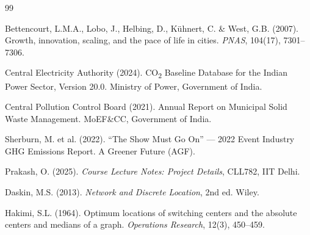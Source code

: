 \documentclass[11pt,a4paper]{article}
\begin{document}
\begin{thebibliography}{99}

Bettencourt, L.M.A., Lobo, J., Helbing, D., K\"uhnert, C. \& West, G.B. (2007).
Growth, innovation, scaling, and the pace of life in cities.
\textit{PNAS}, 104(17), 7301--7306.

Central Electricity Authority (2024).
CO\textsubscript{2} Baseline Database for the Indian Power Sector, Version 20.0.
Ministry of Power, Government of India.

Central Pollution Control Board (2021).
Annual Report on Municipal Solid Waste Management.
MoEF\&CC, Government of India.

Sherburn, M. et al. (2022).
``The Show Must Go On'' --- 2022 Event Industry GHG Emissions Report.
A Greener Future (AGF).

Prakash, O. (2025).
\textit{Course Lecture Notes: Project Details}, CLL782, IIT Delhi.

Daskin, M.S. (2013).
\textit{Network and Discrete Location}, 2nd ed. Wiley.

Hakimi, S.L. (1964).
Optimum locations of switching centers and the absolute centers and medians of a graph.
\textit{Operations Research}, 12(3), 450--459.

\end{thebibliography}
\end{document}
